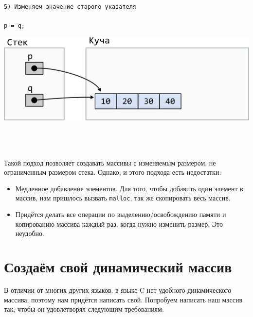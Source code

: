 \documentclass{article}
\begin{document}
\noindent\begin{minipage}{.45\textwidth}
\begin{lstlisting}
5) Изменяем значение старого указателя

p = q;
\end{lstlisting}
\end{minipage}
\begin{minipage}{.45\textwidth}
\includegraphics[scale=0.75]{../images/malloc_realocation5.png}
\end{minipage}
\quad\\
\quad\\
\quad\\

Такой подход позволяет создавать массивы с изменяемым размером, не ограниченным размером стека.
Однако, и этого подхода есть недостатки:
\begin{itemize}
\item Медленное добавление элементов. Для того, чтобы добавить один элемент в массив, нам пришлось вызвать \texttt{malloc}, так же скопировать весь массив.
\item Придётся делать все операции по выделению/освобождению памяти и копированию массива каждый раз, когда нужно изменить размер. Это неудобно.
\end{itemize}



\newpage
\section*{Создаём свой динамический массив}

В отличии от многих других языков, в языке C нет удобного динамического массива, поэтому нам придётся написать свой. Попробуем написать наш массив так, чтобы он удовлетворял следующим требованиям:
\end{document}
